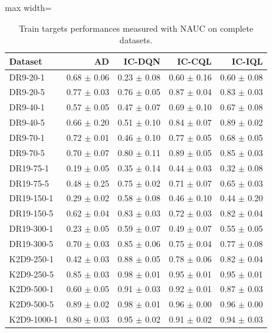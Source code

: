 \documentclass{article}
\begin{document}
\begin{table}[ht]
    \label{tab:}
    \begin{center}
    \caption{Train targets performances measured with NAUC on complete datasets.}
    \begin{small}
    \begin{adjustbox}{max width=\columnwidth}
		\begin{tabular}{l|rrrr}
		\toprule
	\textbf{Dataset} & \textbf{AD} & \textbf{IC-DQN} & \textbf{IC-CQL} & \textbf{IC-IQL}\\
\midrule
DR9-20-1 & 0.68 $\pm$ 0.06 & 0.23 $\pm$ 0.08 & 0.60 $\pm$ 0.16 & 0.60 $\pm$ 0.08\\
DR9-20-5 & 0.77 $\pm$ 0.03 & 0.76 $\pm$ 0.05 & 0.87 $\pm$ 0.04 & 0.83 $\pm$ 0.03\\
DR9-40-1 & 0.57 $\pm$ 0.05 & 0.47 $\pm$ 0.07 & 0.69 $\pm$ 0.10 & 0.67 $\pm$ 0.08\\
DR9-40-5 & 0.66 $\pm$ 0.20 & 0.51 $\pm$ 0.10 & 0.84 $\pm$ 0.07 & 0.89 $\pm$ 0.02\\
DR9-70-1 & 0.72 $\pm$ 0.01 & 0.46 $\pm$ 0.10 & 0.77 $\pm$ 0.05 & 0.68 $\pm$ 0.05\\
DR9-70-5 & 0.70 $\pm$ 0.07 & 0.80 $\pm$ 0.11 & 0.89 $\pm$ 0.05 & 0.85 $\pm$ 0.03\\
DR19-75-1 & 0.19 $\pm$ 0.05 & 0.35 $\pm$ 0.14 & 0.44 $\pm$ 0.03 & 0.32 $\pm$ 0.08\\
DR19-75-5 & 0.48 $\pm$ 0.25 & 0.75 $\pm$ 0.02 & 0.71 $\pm$ 0.07 & 0.65 $\pm$ 0.03\\
DR19-150-1 & 0.29 $\pm$ 0.02 & 0.58 $\pm$ 0.08 & 0.46 $\pm$ 0.10 & 0.44 $\pm$ 0.20\\
DR19-150-5 & 0.62 $\pm$ 0.04 & 0.83 $\pm$ 0.03 & 0.72 $\pm$ 0.03 & 0.82 $\pm$ 0.04\\
DR19-300-1 & 0.23 $\pm$ 0.05 & 0.59 $\pm$ 0.07 & 0.49 $\pm$ 0.07 & 0.55 $\pm$ 0.05\\
DR19-300-5 & 0.70 $\pm$ 0.03 & 0.85 $\pm$ 0.06 & 0.75 $\pm$ 0.04 & 0.77 $\pm$ 0.08\\
K2D9-250-1 & 0.42 $\pm$ 0.03 & 0.88 $\pm$ 0.05 & 0.78 $\pm$ 0.06 & 0.82 $\pm$ 0.04\\
K2D9-250-5 & 0.85 $\pm$ 0.03 & 0.98 $\pm$ 0.01 & 0.95 $\pm$ 0.01 & 0.95 $\pm$ 0.01\\
K2D9-500-1 & 0.60 $\pm$ 0.05 & 0.91 $\pm$ 0.03 & 0.92 $\pm$ 0.01 & 0.87 $\pm$ 0.03\\
K2D9-500-5 & 0.89 $\pm$ 0.02 & 0.98 $\pm$ 0.01 & 0.96 $\pm$ 0.00 & 0.96 $\pm$ 0.00\\
K2D9-1000-1 & 0.80 $\pm$ 0.03 & 0.95 $\pm$ 0.02 & 0.91 $\pm$ 0.02 & 0.94 $\pm$ 0.03\\

\end{tabular}
\end{adjustbox}
\end{small}
\end{center}
\end{table}
\end{document}

